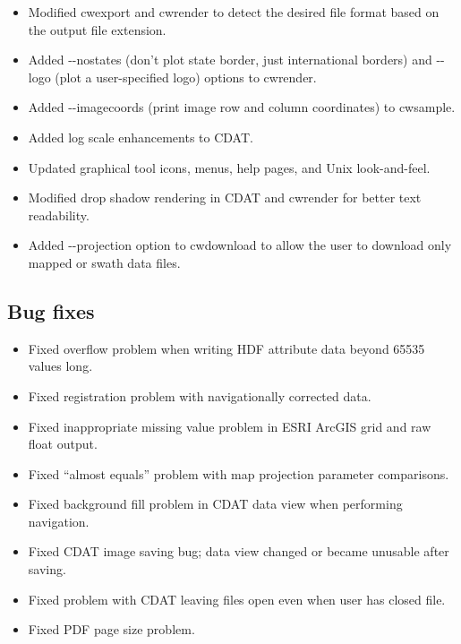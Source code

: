 \begin{itemize}
  \item Modified cwexport and cwrender to detect the desired file
  format based on the output file extension.

  \item Added -{-}nostates (don't plot state border, just international
  borders) and -{-}logo (plot a user-specified logo) options to
  cwrender.

  \item Added -{-}imagecoords (print image row and column coordinates)
  to cwsample.

  \item Added log scale enhancements to CDAT.

  \item Updated graphical tool icons, menus, help pages, and Unix
  look-and-feel.

  \item Modified drop shadow rendering in CDAT and cwrender for better
  text readability.

  \item Added -{-}projection option to cwdownload to allow the user to
  download only mapped or swath data files.

\end{itemize}

\subsection*{Bug fixes}
\begin{itemize}

  \item Fixed overflow problem when writing HDF attribute data beyond
  65535 values long.

  \item Fixed registration problem with navigationally corrected data.

  \item Fixed inappropriate missing value problem in ESRI ArcGIS grid
  and raw float output.

  \item Fixed ``almost equals'' problem with map projection parameter
  comparisons.

  \item Fixed background fill problem in CDAT data view when
  performing navigation.

  \item Fixed CDAT image saving bug; data view changed or became
  unusable after saving.

  \item Fixed problem with CDAT leaving files open even when user has
  closed file.

  \item Fixed PDF page size problem.

\end{itemize}

